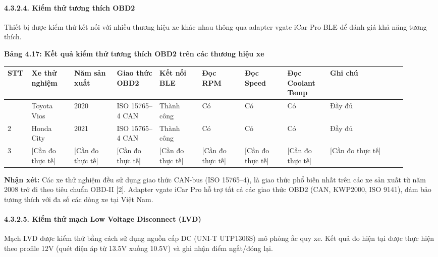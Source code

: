 \documentclass[13pt,a4paper]{extarticle}
\newcounter{none} %
\newcommand{\thesislongtableorignewline}{}
\let\thesislongtableorignewline\\
\renewcommand{\\}{\thesislongtableorignewline\hline}%
\let\\\thesislongtableorignewline
\newcommand{\thesistabletitle}[1]{%
  \begin{center}\textbf{#1}\end{center}%
}
\begin{document}
\paragraph{4.3.2.4. Kiểm thử tương thích
OBD2}\label{4324-kiux1ec3m-thux1eed-tux1b0ux1a1ng-thuxedch-obd2}

Thiết bị được kiểm thử kết nối với nhiều thương hiệu xe khác nhau thông
qua adapter vgate iCar Pro BLE để đánh giá khả năng tương thích.

\thesistabletitle{Bảng 4.17: Kết quả kiểm thử tương thích OBD2 trên các thương hiệu
xe}

{\def\LTcaptype{none} %
\begin{longtable}{|p{0.04\linewidth}|p{0.10\linewidth}|p{0.10\linewidth}|p{0.10\linewidth}|p{0.10\linewidth}|p{0.10\linewidth}|p{0.10\linewidth}|p{0.10\linewidth}|p{0.18\linewidth}|}
\hline \textbf{STT} & \textbf{Xe thử nghiệm} & \textbf{Năm sản xuất} & \textbf{Giao thức OBD2} & \textbf{Kết nối BLE} & \textbf{Đọc
RPM} & \textbf{Đọc Speed} & \textbf{Đọc Coolant Temp} & \textbf{Ghi chú} \\
\hline
\endhead
\hline
\endlastfoot
1 & Toyota Vios & 2020 & ISO 15765--4 CAN & Thành công & Có & Có & Có &
Đầy đủ \\
2 & Honda City & 2021 & ISO 15765--4 CAN & Thành công & Có & Có & Có &
Đầy đủ \\
3 & {[}Cần đo thực tế{]} & {[}Cần đo thực tế{]} & {[}Cần đo thực tế{]} &
{[}Cần đo thực tế{]} & {[}Cần đo thực tế{]} & {[}Cần đo thực tế{]} &
{[}Cần đo thực tế{]} & {[}Cần đo thực tế{]} \\
\end{longtable}
}

\textbf{Nhận xét:} Các xe thử nghiệm đều sử dụng giao thức CAN-bus (ISO
15765--4), là giao thức phổ biến nhất trên các xe sản xuất từ năm 2008
trở đi theo tiêu chuẩn OBD-II {[}2{]}. Adapter vgate iCar Pro hỗ trợ tất
cả các giao thức OBD2 (CAN, KWP2000, ISO 9141), đảm bảo tương thích với
đa số các dòng xe tại Việt Nam.

\paragraph{4.3.2.5. Kiểm thử mạch Low Voltage Disconnect
(LVD)}\label{4325-kiux1ec3m-thux1eed-mux1ea1ch-low-voltage-disconnect-lvd}

Mạch LVD được kiểm thử bằng cách sử dụng nguồn cấp DC (UNI-T UTP1306S)
mô phỏng ắc quy xe. Kết quả đo hiện tại được thực hiện theo profile 12V
(quét điện áp từ 13.5V xuống 10.5V) và ghi nhận điểm ngắt/đóng lại.
\end{document}
